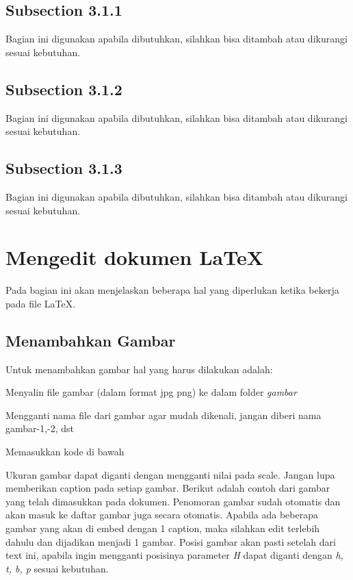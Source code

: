 \subsection{Subsection 3.1.1}
Bagian ini digunakan apabila dibutuhkan, silahkan bisa ditambah atau dikurangi sesuai kebutuhan.

\subsection{Subsection 3.1.2}
Bagian ini digunakan apabila dibutuhkan, silahkan bisa ditambah atau dikurangi sesuai kebutuhan.

\subsection{Subsection 3.1.3}
Bagian ini digunakan apabila dibutuhkan, silahkan bisa ditambah atau dikurangi sesuai kebutuhan.

\section{Mengedit dokumen \LaTeX}
Pada bagian ini akan menjelaskan beberapa hal yang diperlukan ketika bekerja pada file \LaTeX.

\subsection{Menambahkan Gambar}
Untuk menambahkan gambar hal yang harus dilakukan adalah:
\begin{packed_enum}
    \item Menyalin file gambar (dalam format jpg \/ png) ke dalam folder \textit{gambar}
    \item Mengganti nama file dari gambar agar mudah dikenali, jangan diberi nama gambar-1,-2, dst
    \item Memasukkan kode di bawah
\end{packed_enum}


Ukuran gambar dapat diganti dengan mengganti nilai pada scale. Jangan lupa memberikan caption pada setiap gambar. Berikut adalah contoh dari gambar yang telah dimasukkan pada dokumen. Penomoran gambar sudah otomatis dan akan masuk ke daftar gambar juga secara otomatis. Apabila ada beberapa gambar yang akan di embed dengan 1 caption, maka silahkan edit terlebih dahulu dan dijadikan menjadi 1 gambar. Posisi gambar akan pasti setelah dari text ini, apabila ingin mengganti posisinya parameter \textit{H} dapat diganti dengan \textit{h, t, b, p} sesuai kebutuhan.

